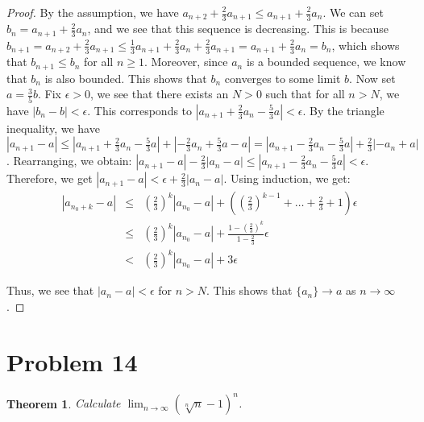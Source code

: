 \documentclass[psamsfonts]{amsart}
\newtheorem{thm}{Theorem}[section]
\theoremstyle{definition}
\theoremstyle{remark}
\numberwithin{equation}{section}
\begin{document}
\begin{proof}
By the assumption, we have $a_{n+2} + \frac{2}{3} a_{n+1} \leq a_{n+1} + \frac{2}{3} a_n$. We can set $b_n = a_{n+1} + \frac{2}{3} a_n$, and we see that this sequence is decreasing. This is because $b_{n+1} = a_{n+2} + \frac{2}{3} a_{n+1} \leq \frac{1}{3} a_{n+1} + \frac{2}{3} a_n + \frac{2}{3} a_{n+1} = a_{n+1} + \frac{2}{3} a_n = b_n$, which shows that $b_{n+1} \leq b_n$ for all $n \geq 1$. Moreover, since $a_n$ is a bounded sequence, we know that $b_n$ is also bounded. This shows that $b_n$ converges to some limit $b$. Now set $a = \frac{3}{5}b$. Fix $\epsilon > 0$, we see that there exists an $N > 0$ such that for all $n > N$, we have $|b_n - b| < \epsilon$. This corresponds to $|a_{n+1} + \frac{2}{3} a_n - \frac{5}{3}a| < \epsilon$. By the triangle inequality, we have $|a_{n+1} - a| \leq |a_{n+1}+\frac{2}{3} a_n - \frac{5}{3} a| + | - \frac{2}{3} a_n + \frac{5}{3}a - a | = |a_{n+1} - \frac{2}{3} a_n - \frac{5}{3} a | + \frac{2}{3} | - a_n + a|$. Rearranging, we obtain: $ |a_{n+1} - a| - \frac{2}{3} |a_n - a| \leq |a_{n+1} - \frac{2}{3} a_n - \frac{5}{3} a| < \epsilon$. Therefore, we get $|a_{n+1} - a| < \epsilon + \frac{2}{3} |a_n - a|$. Using induction, we get:
\begin{eqnarray}
|a_{n_0+k} - a| &\leq&  \left( \frac{2}{3} \right)^k |a_{n_0} - a| + \left( \left( \frac{2}{3} \right)^{k-1} + \ldots + \frac{2}{3} + 1 \right) \epsilon \\
& \leq & \left( \frac{2}{3} \right)^k |a_{n_0} - a| + \frac{1 - (\frac{2}{3} )^k}{1 - \frac{2}{3}} \epsilon \\
&<& \left( \frac{2}{3} \right)^k |a_{n_0} - a| + 3 \epsilon
\end{eqnarray}  

Thus, we see that $|a_n - a| < \epsilon$ for $n > N$. This shows that $\{ a_n \} \to a$ as $n \to \infty$. 
\end{proof}

\section{Problem 14}

\begin{thm}
Calculate $\lim_{n \to \infty} (\sqrt[n]{n} - 1)^n$. 
\end{thm}
\end{document}
